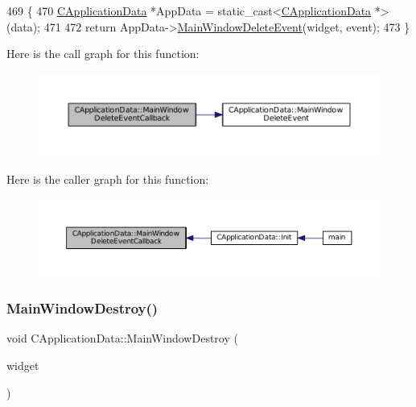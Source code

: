 \begin{DoxyCode}
469                                                                                                          \{
470     \hyperlink{classCApplicationData}{CApplicationData} *AppData = \textcolor{keyword}{static\_cast<}\hyperlink{classCApplicationData}{CApplicationData} *\textcolor{keyword}{>}(data);
471 
472     \textcolor{keywordflow}{return} AppData->\hyperlink{classCApplicationData_afd73780d7dca117edbe341cb3c908c04}{MainWindowDeleteEvent}(widget, event);
473 \}
\end{DoxyCode}
Here is the call graph for this function\+:\nopagebreak
\begin{figure}[H]
\begin{center}
\leavevmode
\includegraphics[width=350pt]{classCApplicationData_a4b2110c03e030cf11b733955963f8854_cgraph}
\end{center}
\end{figure}
Here is the caller graph for this function\+:\nopagebreak
\begin{figure}[H]
\begin{center}
\leavevmode
\includegraphics[width=350pt]{classCApplicationData_a4b2110c03e030cf11b733955963f8854_icgraph}
\end{center}
\end{figure}
\hypertarget{classCApplicationData_a202437b2380956a5519722937cd9f96a}{}\label{classCApplicationData_a202437b2380956a5519722937cd9f96a} 
\subsubsection{\texorpdfstring{Main\+Window\+Destroy()}{MainWindowDestroy()}}
{\footnotesize\ttfamily void C\+Application\+Data\+::\+Main\+Window\+Destroy (\begin{DoxyParamCaption}\item[{Gtk\+Widget $\ast$}]{widget }\end{DoxyParamCaption})\hspace{0.3cm}{\ttfamily [protected]}}



